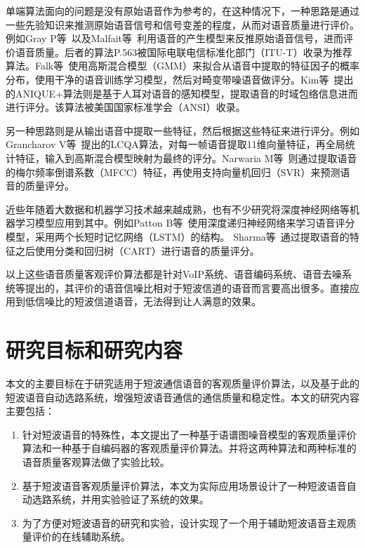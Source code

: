 单端算法面向的问题是没有原始语音作为参考的，在这种情况下，一种思路是通过一些先验知识来推测原始语音信号和信号变差的程度，从而对语音质量进行评价。例如Gray P等~\cite{gray2000non}以及Malfait等~\cite{malfait2006p}利用语音的产生模型来反推原始语音信号，进而评价语音质量。后者的算法P.563被国际电联电信标准化部门（ITU-T）收录为推荐算法。Falk等~\cite{falk2006nonintrusive}使用高斯混合模型（GMM）来拟合从语音中提取的特征因子的概率分布，使用干净的语音训练学习模型，然后对畸变带噪语音做评分。Kim等~\cite{ANIQUE+}提出的ANIQUE+算法则是基于人耳对语音的感知模型，提取语音的时域包络信息进而进行评分。该算法被美国国家标准学会（ANSI）收录。

另一种思路则是从输出语音中提取一些特征，然后根据这些特征来进行评分。例如Grancharov V等~\cite{grancharov2006low}提出的LCQA算法，对每一帧语音提取11维向量特征，再全局统计特征，输入到高斯混合模型映射为最终的评分。Narwaria M等~\cite{narwaria2010non}则通过提取语音的梅尔频率倒谱系数（MFCC）特征，再使用支持向量机回归（SVR）来预测语音的质量评分。

近些年随着大数据和机器学习技术越来越成熟，也有不少研究将深度神经网络等机器学习模型应用到其中。例如Patton B等~\cite{patton2016automos}使用深度递归神经网络来学习语音评分模型，采用两个长短时记忆网络（LSTM）的结构。 Sharma等~\cite{sharma2016data}通过提取语音的特征之后使用分类和回归树（CART）进行语音的质量评分。

以上这些语音质量客观评价算法都是针对VoIP系统、语音编码系统、语音去噪系统等提出的，其评价的语音信噪比相对于短波信道的语音而言要高出很多。直接应用到低信噪比的短波信道语音，无法得到让人满意的效果。


\section{研究目标和研究内容}

本文的主要目标在于研究适用于短波通信语音的客观质量评价算法，以及基于此的短波语音自动选路系统，增强短波语音通信的通信质量和稳定性。本文的研究内容主要包括：
\begin{enumerate}
\item 针对短波语音的特殊性，本文提出了一种基于语谱图噪音模型的客观质量评价算法和一种基于自编码器的客观质量评价算法。并将这两种算法和两种标准的语音质量客观算法做了实验比较。
\item 基于短波语音客观质量评价算法，本文为实际应用场景设计了一种短波语音自动选路系统，并用实验验证了系统的效果。
\item 为了方便对短波语音的研究和实验，设计实现了一个用于辅助短波语音主观质量评价的在线辅助系统。
\end{enumerate}


